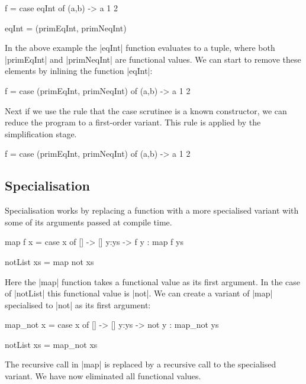 \documentclass[preprint]{sigplanconf}
\begin{document}
\begin{example}
\begin{code}
f = case  eqInt of
          (a,b) -> a 1 2

eqInt = (primEqInt, primNeqInt)
\end{code}

In the above example the |eqInt| function evaluates to a tuple, where both |primEqInt| and |primNeqInt| are functional values. We can start to remove these elements by inlining the function |eqInt|:

\begin{code}
f = case  (primEqInt, primNeqInt) of
          (a,b) -> a 1 2
\end{code}

Next if we use the rule that the case scrutinee is a known constructor, we can reduce the program to a first-order variant. This rule is applied by the simplification stage.

\begin{code}
f = case  (primEqInt, primNeqInt) of
          (a,b) -> a 1 2
\end{code}
\end{example}

\subsection{Specialisation}

Specialisation works by replacing a function with a more specialised variant with some of its arguments passed at compile time.

\begin{example}
\begin{code}
map f x = case  x of
                []    -> []
                y:ys  -> f y : map f ys

notList xs = map not xs
\end{code}

Here the |map| function takes a functional value as its first argument. In the case of |notList| this functional value is |not|. We can create a variant of |map| specialised to |not| as its first argument:

\begin{code}
map_not x = case  x of
                  []    -> []
                  y:ys  -> not y : map_not ys

notList xs = map_not xs
\end{code}

The recursive call in |map| is replaced by a recursive call to the specialised variant. We have now eliminated all functional values.
\end{example}
\end{document}
